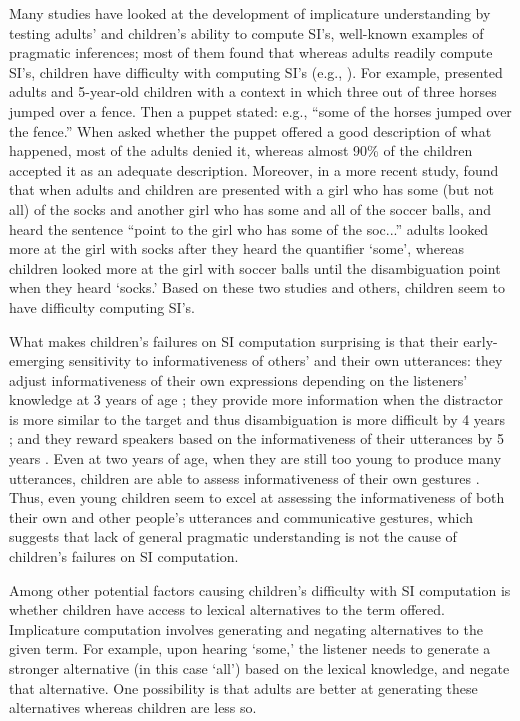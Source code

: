 \documentclass[10pt,letterpaper]{article}
\begin{document}
Many studies have looked at the development of implicature understanding by testing adults' and children's ability to compute SI's, well-known examples of pragmatic inferences; most of them found that whereas adults readily compute SI's, children have difficulty with computing SI's (e.g., ). For example,  presented adults and 5-year-old children with a context in which three out of three horses jumped over a fence. Then a puppet stated: e.g., ``some of the horses jumped over the fence.'' When asked whether the puppet offered a good description of what happened, most of the adults denied it, whereas almost 90\% of the children accepted it as an adequate description. Moreover, in a more recent study,  found that when adults and children are presented with a girl who has some (but not all) of the socks and another girl who has some and all of the soccer balls, and heard the sentence ``point to the girl who has some of the soc...'' adults looked more at the girl with socks after they heard the quantifier `some', whereas children looked more at the girl with soccer balls until the disambiguation point when they heard `socks.' Based on these two studies and others, children seem to have difficulty computing SI's.

What makes children's failures on SI computation surprising is that their early-emerging sensitivity to informativeness of others' and their own utterances: they adjust informativeness of their own expressions depending on the listeners' knowledge at 3 years of age \cite{matthews2006effect}; they provide more information when the distractor is more similar to the target and thus disambiguation is more difficult by 4 years \cite{matthews2012two}; and they reward speakers based on the informativeness of their utterances by 5 years \cite{katsos2011pragmatic}. Even at two years of age, when they are still too young to produce many utterances, children are able to assess informativeness of their own gestures \cite{o2001two}. Thus, even young children seem to excel at assessing the informativeness of both their own and other people's utterances and communicative gestures, which suggests that lack of general pragmatic understanding is not the cause of children's failures on SI computation. 

Among other potential factors causing children's difficulty with SI computation is whether children have access to lexical alternatives to the term offered. Implicature computation involves generating and negating alternatives to the given term. For example, upon hearing `some,' the listener needs to generate a stronger alternative (in this case `all') based on the lexical knowledge, and negate that alternative. One possibility is that adults are better at generating these alternatives whereas children are less so.
\end{document}
